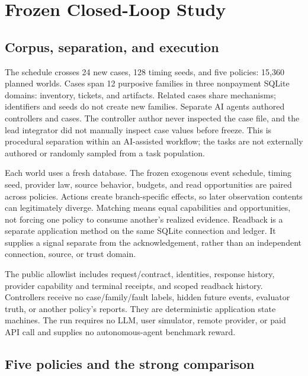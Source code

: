 \documentclass[conference]{IEEEtran}
\begin{document}
\section{Frozen Closed-Loop Study}

\subsection{Corpus, separation, and execution}

The schedule crosses 24 new cases, 128 timing seeds, and five policies: 15,360 planned worlds. Cases span 12 purposive families in three nonpayment SQLite domains: inventory, tickets, and artifacts. Related cases share mechanisms; identifiers and seeds do not create new families. Separate AI agents authored controllers and cases. The controller author never inspected the case file, and the lead integrator did not manually inspect case values before freeze. This is procedural separation within an AI-assisted workflow; the tasks are not externally authored or randomly sampled from a task population.

Each world uses a fresh database. The frozen exogenous event schedule, timing seed, provider law, source behavior, budgets, and read opportunities are paired across policies. Actions create branch-specific effects, so later observation contents can legitimately diverge. Matching means equal capabilities and opportunities, not forcing one policy to consume another's realized evidence. Readback is a separate application method on the same SQLite connection and ledger. It supplies a signal separate from the acknowledgement, rather than an independent connection, source, or trust domain.

The public allowlist includes request/contract, identities, response history, provider capability and terminal receipts, and scoped readback history. Controllers receive no case/family/fault labels, hidden future events, evaluator truth, or another policy's reports. They are deterministic application state machines. The run requires no LLM, user simulator, remote provider, or paid API call and supplies no autonomous-agent benchmark reward.

\subsection{Five policies and the strong comparison}
\end{document}
